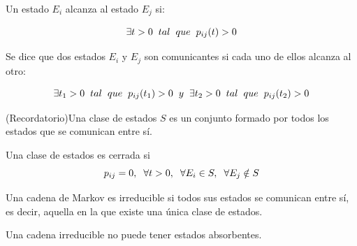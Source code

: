 \documentclass[12pt,a4paper]{article}
\begin{document}
\begin{definition}
	Un estado $E_{i}$ alcanza al estado $E_{j}$ si:

	\begin{equation*}
				\exists t > 0 \hspace{0.2cm}tal \hspace{0.2cm} que \hspace{0.2cm} p_{ij}(t) > 0
	\end{equation*}
	
\end{definition}

 \begin{definition}
 	Se dice que dos estados $E_{i}$ y $E_{j}$ son comunicantes si cada uno de ellos alcanza al otro:
 	
 	\begin{equation*}
 		\exists t_{1} > 0 \hspace{0.2cm}tal \hspace{0.2cm} que \hspace{0.2cm} p_{ij}(t_{1}) > 0 \hspace{0.2cm} y \hspace{0.2cm} \exists t_{2} > 0 \hspace{0.2cm}tal \hspace{0.2cm} que \hspace{0.2cm} p_{ij}(t_{2}) > 0
 	\end{equation*}
 \end{definition}
	\begin{definition}
		(Recordatorio)Una clase de estados $S$ es un conjunto formado por todos los estados que se comunican entre sí.
	\end{definition}
	\begin{definition}
		Una clase de estados es cerrada si $$p_{ij}=0, \hspace{0.2cm} \forall t >0,\hspace{0.2cm} \forall E_{i} \in S,\hspace{0.2cm} \forall E_{j} \notin S$$
	\end{definition}
	
	\begin{definition}
		Una cadena de Markov es irreducible si todos sus estados se comunican entre sí, es decir, aquella en la que existe una única clase de estados.
	\end{definition}
	\begin{prop}
	Una cadena irreducible no puede tener estados absorbentes. 
	\end{prop}
\end{document}
